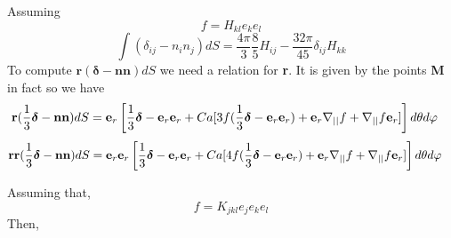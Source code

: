 Assuming 
\begin{equation}
    f = H_{kl} e_ke_l
\end{equation}
\begin{equation}
    \int (\delta_{ij} - n_in_j) dS 
    =
    \frac{4\pi}{3}\frac{8}{5}
    H_{ij}
    - \frac{32\pi}{45}\delta_{ij} H_{kk}
\end{equation}
To compute $\textbf{r}(\bm\delta - \textbf{nn})dS$ we need a relation for \textbf{r}. It is given by the points \textbf{M} in fact so we have
\begin{align}
    \textbf{r}(\frac{1}{3}\bm\delta - \textbf{nn}) dS
    &=
    \textbf{e}_r
    \left[
        \frac{1}{3}\bm\delta   
        - \textbf{e}_r \textbf{e}_r 
        + Ca [
            3f(\frac{1}{3}\bm\delta 
            -  \textbf{e}_r \textbf{e}_r )
            + \textbf{e}_r \mathbf{\nabla}_{||} f 
            + \mathbf{\nabla}_{||} f \textbf{e}_r 
            ]
    \right]d\theta d\varphi
\end{align}
\begin{align}
    \textbf{rr}(\frac{1}{3}\bm\delta - \textbf{nn}) dS
    &= \textbf{e}_r \textbf{e}_r
    \left[
        \frac{1}{3}\bm\delta   
        - \textbf{e}_r \textbf{e}_r 
        + Ca [
            4f(\frac{1}{3}\bm\delta 
            -  \textbf{e}_r \textbf{e}_r )
            + \textbf{e}_r \mathbf{\nabla}_{||} f 
            + \mathbf{\nabla}_{||} f \textbf{e}_r 
            ]
    \right]d\theta d\varphi
\end{align}

Assuming that, 
\begin{equation}
    f = K_{jkl} e_je_ke_l 
\end{equation}
Then, 